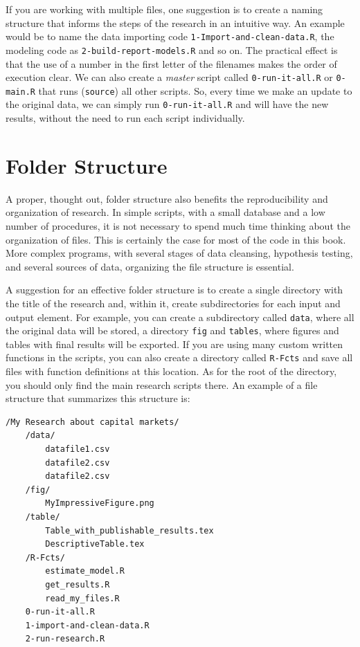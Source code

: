 \documentclass[11pt,]{book}
\begin{document}
If you are working with multiple files, one suggestion is to create a
naming structure that informs the steps of the research in an intuitive
way. An example would be to name the data importing code
\texttt{1-Import-and-clean-data.R}, the modeling code as
\texttt{2-build-report-models.R} and so on. The practical effect is that
the use of a number in the first letter of the filenames makes the order
of execution clear. We can also create a \emph{master} script called
\texttt{0-run-it-all.R} or \texttt{0-main.R} that runs (\texttt{source})
all other scripts. So, every time we make an update to the original
data, we can simply run \texttt{0-run-it-all.R} and will have the new
results, without the need to run each script individually.

\section{Folder Structure}\label{folder-structure}

A proper, thought out, folder structure also benefits the
reproducibility and organization of research. In simple scripts, with a
small database and a low number of procedures, it is not necessary to
spend much time thinking about the organization of files. This is
certainly the case for most of the code in this book. More complex
programs, with several stages of data cleansing, hypothesis testing, and
several sources of data, organizing the file structure is essential.

A suggestion for an effective folder structure is to create a single
directory with the title of the research and, within it, create
subdirectories for each input and output element. For example, you can
create a subdirectory called \texttt{data}, where all the original data
will be stored, a directory \texttt{fig} and \texttt{tables}, where
figures and tables with final results will be exported. If you are using
many custom written functions in the scripts, you can also create a
directory called \texttt{R-Fcts} and save all files with function
definitions at this location. As for the root of the directory, you
should only find the main research scripts there. An example of a file
structure that summarizes this structure is: 

\begin{verbatim}
/My Research about capital markets/
    /data/
        datafile1.csv
        datafile2.csv
        datafile2.csv
    /fig/
        MyImpressiveFigure.png
    /table/
        Table_with_publishable_results.tex
        DescriptiveTable.tex
    /R-Fcts/
        estimate_model.R
        get_results.R
        read_my_files.R
    0-run-it-all.R
    1-import-and-clean-data.R
    2-run-research.R
\end{verbatim}
\end{document}
